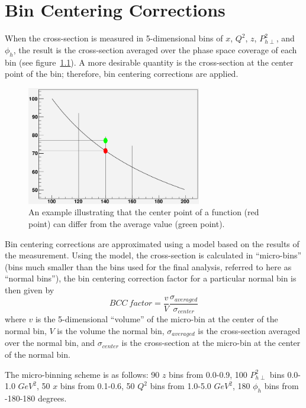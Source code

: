 \chapter{Bin Centering Corrections}
\label{cha:BCC}
%
When the cross-section is measured in 5-dimensional bins of $x$, $Q^2$, $z$, $P_{h\perp}^2$, and $\phi_h$, the result is the cross-section averaged over the phase space coverage of each bin (see figure~\ref{fig:BCC_basicExample}).
A more desirable quantity is the cross-section at the center point of the bin; therefore, bin centering corrections are applied.
%
\begin{figure}[htp]
\centering
\includegraphics[width=3in]{figures/BCC_basicExample.png}
\caption{An example illustrating that the center point of a function (red point) can differ from the average value (green point).}
\label{fig:BCC_basicExample}
\end{figure}

Bin centering corrections are approximated using a model based on the results of the measurement.
Using the model, the cross-section is calculated in ``micro-bins'' (bins much smaller than the bins used for the final analysis, referred to here as ``normal bins''), the bin centering correction factor for a particular normal bin is then given by
\begin{equation}
\label{eq:BCCequation}
BCC\ factor = \frac{v}{V} \frac{\sigma_{averaged}}{\sigma_{center}}
\end{equation}
where $v$ is the 5-dimensional ``volume'' of the micro-bin at the center of the normal bin, $V$ is the volume the normal bin, $\sigma_{averaged}$ is the cross-section averaged over the normal bin, and $\sigma_{center}$ is the cross-section at the micro-bin at the center of the normal bin.

The micro-binning scheme is as follows: 90 $z$ bins from 0.0-0.9, 100 $P_{h\perp}^2$ bins 0.0-1.0 $GeV^2$, 50 $x$ bins from 0.1-0.6, 50 $Q^2$ bins from 1.0-5.0 $GeV^2$, 180 $\phi_h$ bins from -180-180 degrees.

\clearpage
